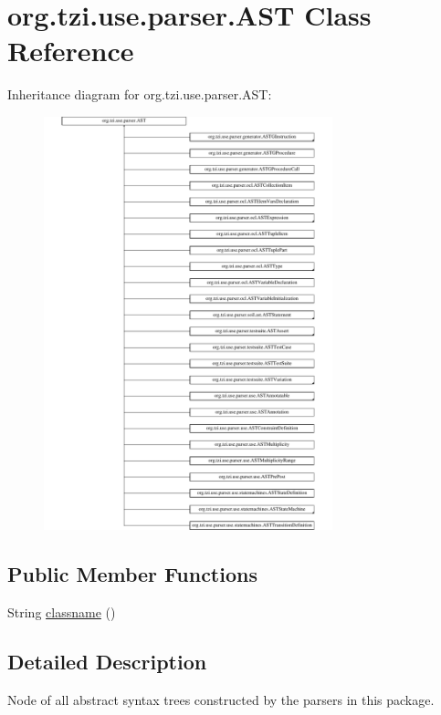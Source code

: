 \hypertarget{classorg_1_1tzi_1_1use_1_1parser_1_1_a_s_t}{\section{org.\-tzi.\-use.\-parser.\-A\-S\-T Class Reference}
\label{classorg_1_1tzi_1_1use_1_1parser_1_1_a_s_t}
}
Inheritance diagram for org.\-tzi.\-use.\-parser.\-A\-S\-T\-:\begin{figure}[H]
\begin{center}
\leavevmode
\includegraphics[height=12.000000cm]{classorg_1_1tzi_1_1use_1_1parser_1_1_a_s_t}
\end{center}
\end{figure}
\subsection*{Public Member Functions}
\begin{DoxyCompactItemize}
\item 
String \hyperlink{classorg_1_1tzi_1_1use_1_1parser_1_1_a_s_t_ad833d12ce42bce93cf471418d1bd22e2}{classname} ()
\end{DoxyCompactItemize}


\subsection{Detailed Description}
Node of all abstract syntax trees constructed by the parsers in this package.

